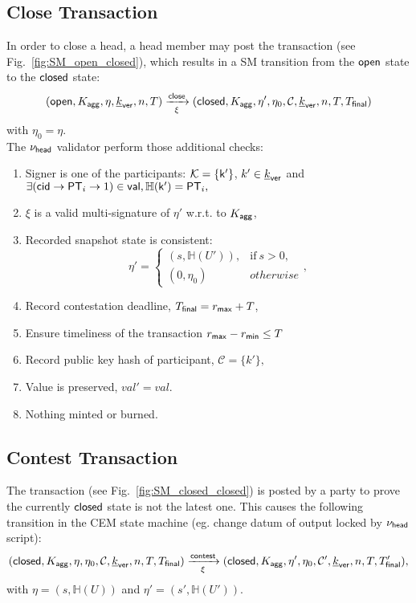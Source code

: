 \subsection{Close Transaction}\label{sec:close-tx}



In order to close a head, a head member may post the \mtxClose{} transaction (see Fig.~\ref{fig:SM_open_closed}), which results in a SM transition
from the $\mathsf{open}$ state to the $\mathsf{closed}$ state:
$$
(\mathsf{open},K_{\mathsf{agg}},\eta,\underline{k}_{\mathsf{ver}},n,T) \xrightarrow[\xi]{\mathsf{close}} (\mathsf{closed},K_{\mathsf{agg}},\eta',\eta_0,\mathcal{C},\underline{k}_{\mathsf{ver}},n,T,T_{\mathsf{final}}) 
$$
with $\eta_0 = \eta$. \\

\noindent The $\nu_\mathsf{head}$ validator perform those additional checks:
\begin{enumerate}
  \item Signer is one of the participants: $\mathcal K = \{\mathsf{k'}\}$, $k' \in \underline{k}_{\mathsf{ver}}$ and
    $
    \exists (\mathsf{cid} \rightarrow \mathsf{PT}_i \rightarrow 1) \in \mathsf{val}, \mathbb{H}(\mathsf{k'}) = \mathsf{PT}_i,
    $
  \item $\xi$ is a valid multi-signature of $\eta'$ w.r.t. to $K_{\mathsf{agg}}$,
  \item Recorded snapshot state is consistent:
    $$
    \eta' = \left\{\begin{array}{ll}
         (s, \mathbb{H}(U')), & \mathrm{if}\ s > 0,\\
         (0, \eta_0) & \mathit{otherwise} 
    \end{array}\right.,
    $$
  \item Record contestation deadline, $T_{\mathsf{final}} = r_{\mathsf{max}} + T$,
  \item Ensure timeliness of the transaction $r_{\mathsf{max}} - r_{\mathsf{min}} \leq T$ 
  \item Record public key hash of participant, $\mathcal{C} = \{k'\},$ 
  \item Value is preserved, $val' = val.$
  \item Nothing minted or burned.
\end{enumerate}

\subsection{Contest Transaction}\label{sec:contest-tx}



The \mtxContest{} transaction (see
Fig.~\ref{fig:SM_closed_closed}) is posted by a party to prove the currently $\mathsf{closed}$ state is not the latest one. This causes the following transition in the CEM state machine (eg. change datum of output locked by $\nu_\mathsf{head}$ script):
$$
   (\mathsf{closed},K_{\mathsf{agg}},\eta,\eta_0,\mathcal{C},\underline{k}_{\mathsf{ver}},n,T,T_{\mathsf{final}}) \xrightarrow[\xi]{\mathsf{contest}} (\mathsf{closed},K_{\mathsf{agg}},\eta',\eta_0,\mathcal{C}', \underline{k}_{\mathsf{ver}},n,T,T_{\mathsf{final}}'),
$$
with $\eta = (s, \mathbb{H}(U))$ and $\eta' = (s', \mathbb{H}(U')).$ \\

